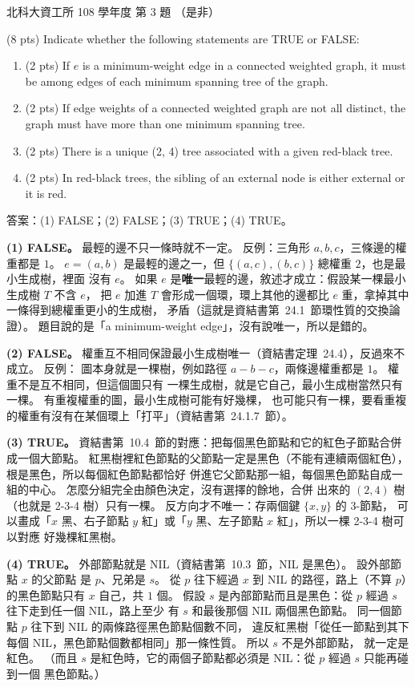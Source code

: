 \begin{pastexam}[label={px:ntut-108-ci-05}]{北科大資工所 108 學年度 第 3 題}
（是非）

(8 pts) Indicate whether the following statements are TRUE or FALSE:
\begin{enumerate}[label=(\arabic*)]
\item (2 pts) If $e$ is a minimum-weight edge in a connected weighted graph, it must be among edges
of each minimum spanning tree of the graph.
\item (2 pts) If edge weights of a connected weighted graph are not all distinct, the graph must
have more than one minimum spanning tree.
\item (2 pts) There is a unique (2, 4) tree associated with a given red-black tree.
\item (2 pts) In red-black trees, the sibling of an external node is either external or it is red.
\end{enumerate}
\end{pastexam}

\begin{pastsoln}
答案：(1) FALSE；(2) FALSE；(3) TRUE；(4) TRUE。

\textbf{(1) FALSE。} 最輕的邊不只一條時就不一定。 反例：三角形 $a, b, c$，三條邊的權重都是
$1$。 $e = (a, b)$ 是最輕的邊之一，但 $\{(a, c), (b, c)\}$ 總權重 $2$，也是最小生成樹，裡面
沒有 $e$。 如果 $e$ 是\textbf{唯一}最輕的邊，敘述才成立：假設某一棵最小生成樹 $T$ 不含 $e$，
把 $e$ 加進 $T$ 會形成一個環，環上其他的邊都比 $e$ 重，拿掉其中一條得到總權重更小的生成樹，
矛盾（這就是資結書第~24.1~節環性質的交換論證）。 題目說的是「a minimum-weight edge」，沒有說唯一，所以是錯的。

\textbf{(2) FALSE。} 權重互不相同保證最小生成樹唯一（資結書定理~24.4），反過來不成立。 反例：
圖本身就是一棵樹，例如路徑 $a - b - c$，兩條邊權重都是 $1$。 權重不是互不相同，但這個圖只有
一棵生成樹，就是它自己，最小生成樹當然只有一棵。 有重複權重的圖，最小生成樹可能有好幾棵，
也可能只有一棵，要看重複的權重有沒有在某個環上「打平」（資結書第~24.1.7~節）。

\textbf{(3) TRUE。} 資結書第~10.4~節的對應：把每個黑色節點和它的紅色子節點合併成一個大節點。
紅黑樹裡紅色節點的父節點一定是黑色（不能有連續兩個紅色），根是黑色，所以每個紅色節點都恰好
併進它父節點那一組，每個黑色節點自成一組的中心。 怎麼分組完全由顏色決定，沒有選擇的餘地，合併
出來的 $(2, 4)$ 樹（也就是 2-3-4 樹）只有一棵。 反方向才不唯一：存兩個鍵 $\{x, y\}$ 的 3-節點，
可以畫成「$x$ 黑、右子節點 $y$ 紅」或「$y$ 黑、左子節點 $x$ 紅」，所以一棵 2-3-4 樹可以對應
好幾棵紅黑樹。

\textbf{(4) TRUE。} 外部節點就是 NIL（資結書第~10.3~節，NIL 是黑色）。 設外部節點 $x$ 的父節點
是 $p$、兄弟是 $s$。 從 $p$ 往下經過 $x$ 到 NIL 的路徑，路上（不算 $p$）的黑色節點只有 $x$
自己，共 $1$ 個。 假設 $s$ 是內部節點而且是黑色：從 $p$ 經過 $s$ 往下走到任一個 NIL，路上至少
有 $s$ 和最後那個 NIL 兩個黑色節點。 同一個節點 $p$ 往下到 NIL 的兩條路徑黑色節點個數不同，
違反紅黑樹「從任一節點到其下每個 NIL，黑色節點個數都相同」那一條性質。 所以 $s$ 不是外部節點，
就一定是紅色。 （而且 $s$ 是紅色時，它的兩個子節點都必須是 NIL：從 $p$ 經過 $s$ 只能再碰到一個
黑色節點。）
\end{pastsoln}
